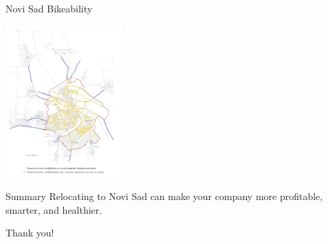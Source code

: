 \documentclass[presentation]{beamer}
\begin{document}
\begin{frame}[label={sec:org8732cd7}]{Novi Sad Bikeability}
\begin{center}
\includegraphics[width=170px]{bicikleNetworkNoviSad.png}
\end{center}
\end{frame}
\begin{frame}[label={sec:org3067b18}]{Summary}
Relocating to Novi Sad can make your company more profitable, smarter, and healthier.

Thank you!
\end{frame}
\end{document}
